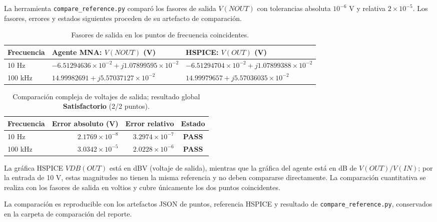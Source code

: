 La herramienta \texttt{compare\_reference.py} comparó los fasores de salida $V(NOUT)$ con tolerancias absoluta $10^{-6}$ V y relativa $2\times10^{-5}$. Los fasores, errores y estados siguientes proceden de su artefacto de comparación.

\begin{table}[H]
\centering
\small
\begin{tabularx}{\linewidth}{lXX}
\toprule
Frecuencia & Agente MNA: $V(NOUT)$ (V) & HSPICE: $V(OUT)$ (V) \\
\midrule
10 Hz & $-6.51294636\times10^{-2}+j1.07899595\times10^{-2}$ & $-6.51294704\times10^{-2}+j1.07899388\times10^{-2}$ \\
100 kHz & $14.99982691+j5.57037127\times10^{-2}$ & $14.99979657+j5.57036035\times10^{-2}$ \\
\bottomrule
\end{tabularx}
\caption{Fasores de salida en los puntos de frecuencia coincidentes.}
\end{table}

\begin{table}[H]
\centering
\begin{tabular}{lrrc}
\toprule
Frecuencia & Error absoluto (V) & Error relativo & Estado \\
\midrule
10 Hz & $2.1769\times10^{-8}$ & $3.2974\times10^{-7}$ & \textbf{PASS} \\
100 kHz & $3.0342\times10^{-5}$ & $2.0228\times10^{-6}$ & \textbf{PASS} \\
\bottomrule
\end{tabular}
\caption{Comparación compleja de voltajes de salida; resultado global \textbf{Satisfactorio} (2/2 puntos).}
\end{table}

La gráfica HSPICE $VDB(OUT)$ está en dBV (voltaje de salida), mientras que la gráfica del agente está en dB de $V(OUT)/V(IN)$; por la entrada de 10 V, estas magnitudes no tienen la misma referencia y no deben compararse directamente. La comparación cuantitativa se realiza con los fasores de salida en voltios y cubre únicamente los dos puntos coincidentes.


La comparación es reproducible con los artefactos JSON de puntos, referencia HSPICE y resultado de \texttt{compare\_reference.py}, conservados en la carpeta de comparación del reporte.